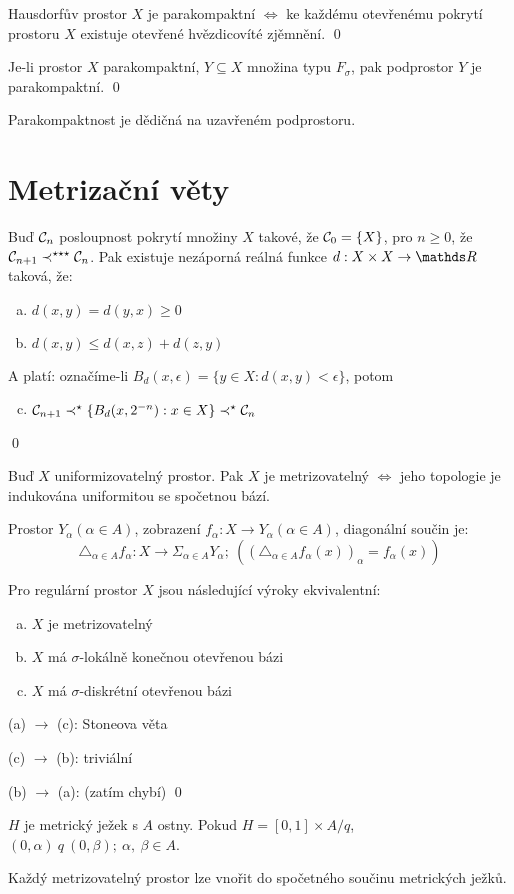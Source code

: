 \documentclass[12pt,a4paper]{article}
\newcommand{\head}[1]{\medskip\noindent {\bf #1}}
\begin{document}
\veta Hausdorfův prostor $X$ je parakompaktní $\iff$ ke každému otevřenému
	pokrytí prostoru $X$ existuje otevřené hvězdicovíté zjěmnění.
\dukaz \qed

\veta Je-li prostor $X$ parakompaktní, $Y \subseteq X$ množina typu $F_\sigma$,
	pak podprostor $Y$ je parakompaktní.
\dukaz \qed

\head {Důsledek:} Parakompaktnost je dědičná na uzavřeném podprostoru.

\section{Metrizační věty}
\lemma Buď $\mathcal{ C }_n$ posloupnost pokrytí množiny $X$ takové, že $\mathcal{ C }_0 =
	\{X\}$, pro $n \geq 0$, že $\mathcal{ C }_{n+1} \prec^{\star\star\star} \mathcal{ C }_n$. Pak
	existuje nezáporná reálná funkce $d : X \times X \to \m R$ taková, že:

	\begin{enumerate}[(a)]
		\item $d(x,y) = d(y,x) \geq 0$
		\item $d(x,y) \leq d(x,z) + d(z,y)$
	\end{enumerate}
	A platí: označíme-li $B_d(x,\epsilon) = \{y \in X : d(x,y) < \epsilon \}$, potom
	\begin{enumerate}[(a)]
		\setcounter{enumi}{2}
		\item $\mathcal{ C }_{n+1} \prec^{\star} \{ B_d(x,2^{-n}) : x \in X\} \prec^{\star} \mathcal{ C }_n$
	\end{enumerate}
\dukaz \qed

\veta [P. S. Uryshon] Buď $X$ uniformizovatelný prostor. Pak $X$ je
	metrizovatelný $\iff$ jeho topologie je indukována uniformitou se spočetnou
	bází.

	Prostor $Y_\alpha (\alpha \in A)$, zobrazení $f_\alpha : X \to Y_\alpha (\alpha \in A)$,
	diagonální součin je:
		$$\triangle_{\alpha \in A} f_\alpha : X \to \Sigma_{\alpha \in A} Y_\alpha;~((\triangle_{\alpha \in A} f_\alpha(x))_\alpha = f_\alpha(x))$$

 Pro regulární prostor $X$ jsou následující výroky
	ekvivalentní:
	\begin{enumerate}[(a)]
		\item $X$ je metrizovatelný
		\item $X$ má $\sigma$-lokálně konečnou otevřenou bázi
		\item $X$ má $\sigma$-diskrétní otevřenou bázi
	\end{enumerate}
\dukaz (a) $\rightarrow$ (c): Stoneova věta

(c) $\rightarrow$ (b): triviální

(b) $\rightarrow$ (a): (zatím chybí)
\qed

 $H$ je metrický ježek s $A$ ostny. Pokud $H = [0,1] \times A / q$, $(0, \alpha)~q~(0, \beta);~\alpha,~\beta \in A$.

\head {Důsledek:}
	Každý metrizovatelný prostor lze vnořit do spočetného součinu metrických
	ježků.
\end{document}
